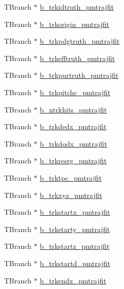 \begin{DoxyCompactItemize}
T\-Branch $\ast$ \hyperlink{classanatree_a1af9561a17956088cedad9486480d01c}{b\-\_\-trkidtruth\-\_\-pmtrajfit}
\item 
T\-Branch $\ast$ \hyperlink{classanatree_a97902af9fabebff2666c6946e86da22d}{b\-\_\-trkorigin\-\_\-pmtrajfit}
\item 
T\-Branch $\ast$ \hyperlink{classanatree_ad99bb6a5f890d8e503485828be98a96d}{b\-\_\-trkpdgtruth\-\_\-pmtrajfit}
\item 
T\-Branch $\ast$ \hyperlink{classanatree_ac1d4fc90c60034641aec255b90304853}{b\-\_\-trkefftruth\-\_\-pmtrajfit}
\item 
T\-Branch $\ast$ \hyperlink{classanatree_a3e0df2cd601679bc3faccd31bee80520}{b\-\_\-trkpurtruth\-\_\-pmtrajfit}
\item 
T\-Branch $\ast$ \hyperlink{classanatree_ad2a711b75b0d93066ef892dc06315a15}{b\-\_\-trkpitchc\-\_\-pmtrajfit}
\item 
T\-Branch $\ast$ \hyperlink{classanatree_ac4b4692c50dc61fd691d97d0fd445554}{b\-\_\-ntrkhits\-\_\-pmtrajfit}
\item 
T\-Branch $\ast$ \hyperlink{classanatree_a70824dac2d9890b38a72e0be6ffaea45}{b\-\_\-trkdedx\-\_\-pmtrajfit}
\item 
T\-Branch $\ast$ \hyperlink{classanatree_a9e86826eb750074fd480290fb18e7592}{b\-\_\-trkdqdx\-\_\-pmtrajfit}
\item 
T\-Branch $\ast$ \hyperlink{classanatree_abac9d506c046cfd2e783361e6801edd7}{b\-\_\-trkresrg\-\_\-pmtrajfit}
\item 
T\-Branch $\ast$ \hyperlink{classanatree_acb6ab2fadf89c222b436ba9b0c5c2559}{b\-\_\-trktpc\-\_\-pmtrajfit}
\item 
T\-Branch $\ast$ \hyperlink{classanatree_a91c664c04321bf2d8fb280257e1565ca}{b\-\_\-trkxyz\-\_\-pmtrajfit}
\item 
T\-Branch $\ast$ \hyperlink{classanatree_aced818adb6a35024f9ff8e82c537e5f3}{b\-\_\-trkstartx\-\_\-pmtrajfit}
\item 
T\-Branch $\ast$ \hyperlink{classanatree_a019e3a2758fc01a83e5c1afbb2158c38}{b\-\_\-trkstarty\-\_\-pmtrajfit}
\item 
T\-Branch $\ast$ \hyperlink{classanatree_ad146936adfd1faee31453548cec69838}{b\-\_\-trkstartz\-\_\-pmtrajfit}
\item 
T\-Branch $\ast$ \hyperlink{classanatree_ab10758ef9c044f8b1f377835013f4aa4}{b\-\_\-trkstartd\-\_\-pmtrajfit}
\item 
T\-Branch $\ast$ \hyperlink{classanatree_ae6791bd0133c7875a0792beb2fc5ea65}{b\-\_\-trkendx\-\_\-pmtrajfit}
\item 

\end{DoxyCompactItemize}
